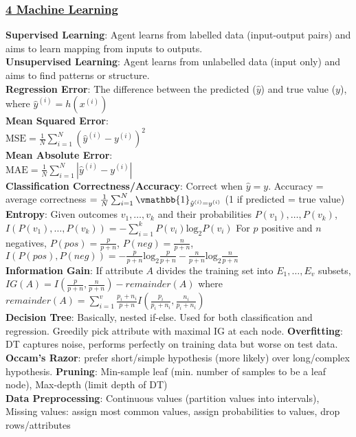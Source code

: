 \documentclass{article}
\begin{document}
\begin{multicols*}{3}
\subsubsection*{\underline{4 Machine Learning}}
\textbf{Supervised Learning}: Agent learns from labelled data (input-output pairs) and aims to learn mapping from inputs to outputs.\\
\textbf{Unsupervised Learning}: Agent learns from unlabelled data (input only) and aims to find patterns or structure.\\
\textbf{Regression Error}: The difference between the predicted ($\hat{y}$) and true value ($y$), where $\hat{y}^{(i)}=h(x^{(i)})$\\
\textbf{Mean Squared Error}:\\ $\text{MSE}=\frac{1}{N}\sum_{i=1}^N (\hat{y}^{(i)}-y^{(i)})^2$ \\
\textbf{Mean Absolute Error}:\\ $\text{MAE} = \frac{1}{N}\sum_{i=1}^N |\hat{y}^{(i)}-y^{(i)}| $ \\
\textbf{Classification Correctness/Accuracy}: Correct when $\hat{y}=y$. Accuracy = average correctness $=\frac{1}{N}\sum_{i=1}^N\vmathbb{1}_{\hat{y}^{(i)}=y^{(i)}}$ (1 if predicted = true value)\\
\textbf{Entropy}: Given outcomes $v_1,\dots,v_k$ and their probabilities $P(v_1),\dots,P(v_k)$, $I(P(v_1),\dots,P(v_k))=-\sum_{i=1}^kP(v_i)\text{log}_2P(v_i)$ For $p$ positive and $n$ negatives, $P(pos)=\frac{p}{p+n}$, $P(neg)=\frac{n}{p+n}$, $I(P(pos),P(neg))=-\frac{p}{p+n}\text{log}_2\frac{p}{p+n}-\frac{n}{p+n}\text{log}_2\frac{n}{p+n}$ \\
\textbf{Information Gain}: If attribute $A$ divides the training set into $E_1,\dots,E_v$ subsets, $IG(A)=I(\frac{p}{p+n}, \frac{n}{p+n})-remainder(A)$ where $remainder(A)=\sum_{i=1}^v\frac{p_i+n_i}{p+n}I(\frac{p_i}{p_i+n_i}, \frac{n_i}{p_i+n_i})$\\
\textbf{Decision Tree}: Basically, nested if-else. Used for both classification and regression. Greedily pick attribute with maximal IG at each node. \textbf{Overfitting}: DT captures noise, performs perfectly on training data but worse on test data. \textbf{Occam's Razor}: prefer short/simple hypothesis (more likely) over long/complex hypothesis. \textbf{Pruning}: Min-sample leaf (min. number of samples to be a leaf node), Max-depth (limit depth of DT)\\
\textbf{Data Preprocessing}: Continuous values (partition values into intervals), Missing values: assign most common values, assign probabilities to values, drop rows/attributes

\end{multicols*}
\end{document}
